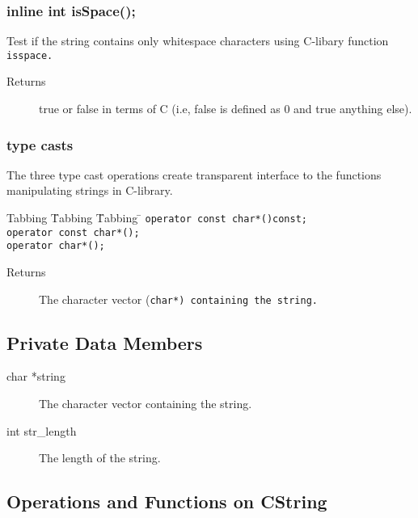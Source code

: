 \subsubsection{inline int isSpace();}
Test if the string contains only whitespace
characters using C-libary function \tt isspace\rm. 
 \begin{description}
    \item [Returns]  true or false in terms of C (i.e, false 
                     is defined as 0 and true anything else).
 \end{description}

\subsubsection{type casts}
The three type cast operations create transparent interface to the functions 
manipulating strings in C-library.

\begin{tabbing}
Tabbing \= Tabbing \= Tabbing \= \kill
\>\>\>\tt  operator const char*()const; \\ 
\>\>\>\tt  operator const char*(); \\
\>\>\>\tt  operator char*();
\end{tabbing}

 \begin{description}
    \item [Returns] The character vector (\tt char*\rm) containing the string.
  \end{description}

\subsection{Private Data Members}
 \begin{description}
    \item [char *string] The character vector containing the string. 
    \item [int str\_length] The length of the string.
\end{description}

\subsection{Operations and Functions on CString}

